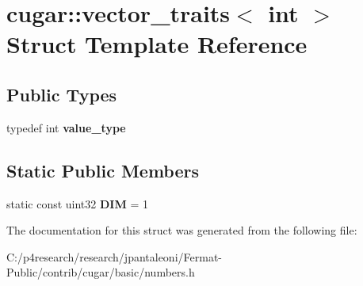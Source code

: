 \hypertarget{structcugar_1_1vector__traits_3_01int_01_4}{}\section{cugar\+:\+:vector\+\_\+traits$<$ int $>$ Struct Template Reference}
\label{structcugar_1_1vector__traits_3_01int_01_4}
\subsection*{Public Types}
\begin{DoxyCompactItemize}
\item 
\mbox{\label{structcugar_1_1vector__traits_3_01int_01_4_ab07c5350c1e2b5e3563d20bf96f4f9c1}} 
typedef int {\bfseries value\+\_\+type}
\end{DoxyCompactItemize}
\subsection*{Static Public Members}
\begin{DoxyCompactItemize}
\item 
\mbox{\label{structcugar_1_1vector__traits_3_01int_01_4_a5a102a6cf8109e308127108963ab8057}} 
static const uint32 {\bfseries D\+IM} = 1
\end{DoxyCompactItemize}


The documentation for this struct was generated from the following file\+:\begin{DoxyCompactItemize}
\item 
C\+:/p4research/research/jpantaleoni/\+Fermat-\/\+Public/contrib/cugar/basic/numbers.\+h\end{DoxyCompactItemize}
